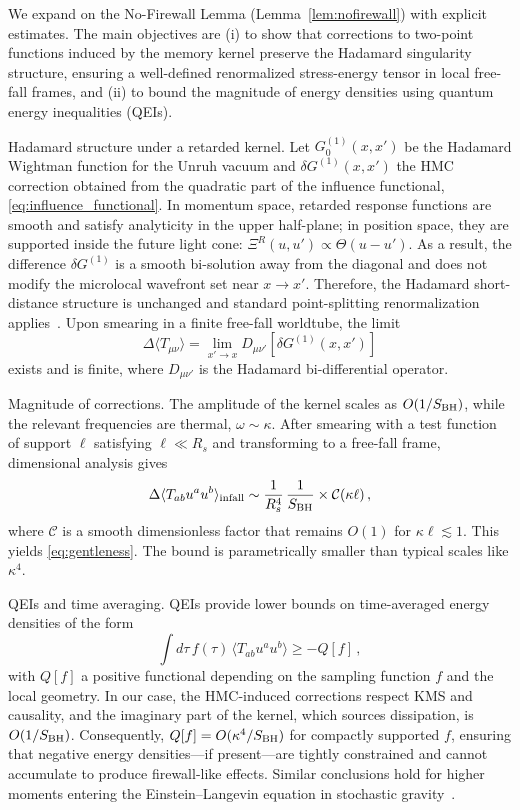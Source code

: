 \documentclass[aps,prd,preprint,onecolumn,superscriptaddress,nofootinbib,longbibliography,floatfix,11pt,showpacs,showkeys]{revtex4-2}
\newcommand{\HMC}{\textsc{HMC}\xspace}
\theoremstyle{plain}
\theoremstyle{definition}
\theoremstyle{remark}
\begin{document}
We expand on the No-Firewall Lemma (Lemma~\ref{lem:nofirewall}) with explicit estimates. The main objectives are (i) to show that corrections to two-point functions induced by the memory kernel preserve the Hadamard singularity structure, ensuring a well-defined renormalized stress-energy tensor in local free-fall frames, and (ii) to bound the magnitude of energy densities using quantum energy inequalities (QEIs).

Hadamard structure under a retarded kernel. Let $G^{(1)}_0(x,x')$ be the Hadamard Wightman function for the Unruh vacuum and $\delta G^{(1)}(x,x')$ the \HMC{} correction obtained from the quadratic part of the influence functional, \eqref{eq:influence_functional}. In momentum space, retarded response functions are smooth and satisfy analyticity in the upper half-plane; in position space, they are supported inside the future light cone: $\Xi^R(u,u')\propto \Theta(u-u')$. As a result, the difference $\delta G^{(1)}$ is a smooth bi-solution away from the diagonal and does not modify the microlocal wavefront set near $x\to x'$. Therefore, the Hadamard short-distance structure is unchanged and standard point-splitting renormalization applies~\cite{Radzikowski:1996}. Upon smearing in a finite free-fall worldtube, the limit
\begin{equation}
\Delta\langle T_{\mu\nu}\rangle = \lim_{x'\to x} D_{\mu\nu'}\left[\delta G^{(1)}(x,x')\right]
\end{equation}
exists and is finite, where $D_{\mu\nu'}$ is the Hadamard bi-differential operator.

Magnitude of corrections. The amplitude of the kernel scales as $O(1/S_{\rm BH})$, while the relevant frequencies are thermal, $\omega\sim \kappa$. After smearing with a test function of support $\ell$ satisfying $\ell\ll R_s$ and transforming to a free-fall frame, dimensional analysis gives
\begin{equation}
\Delta\langle T_{ab}u^a u^b\rangle_{\rm infall} \sim \frac{1}{R_s^4}\,\frac{1}{S_{\rm BH}}\times \mathcal{C}(\kappa \ell)\,,
\end{equation}
where $\mathcal{C}$ is a smooth dimensionless factor that remains $O(1)$ for $\kappa\ell\lesssim 1$. This yields \eqref{eq:gentleness}. The bound is parametrically smaller than typical scales like $\kappa^4$.

QEIs and time averaging. QEIs provide lower bounds on time-averaged energy densities of the form
\begin{equation}
\int d\tau\, f(\tau)\,\langle T_{ab}u^a u^b\rangle \ge - Q[f]\,,
\end{equation}
with $Q[f]$ a positive functional depending on the sampling function $f$ and the local geometry. In our case, the \HMC{}-induced corrections respect KMS and causality, and the imaginary part of the kernel, which sources dissipation, is $O(1/S_{\rm BH})$. Consequently, $Q[f]=O(\kappa^4/S_{\rm BH})$ for compactly supported $f$, ensuring that negative energy densities---if present---are tightly constrained and cannot accumulate to produce firewall-like effects. Similar conclusions hold for higher moments entering the Einstein--Langevin equation in stochastic gravity~\cite{HuVerdaguer:2008}.
\end{document}
